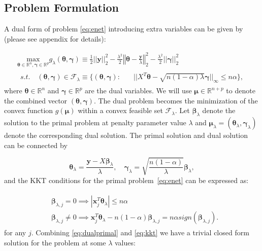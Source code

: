 \subsection{Problem Formulation}

A dual form of problem \eqref{eq:enet} introducing extra variables can be given by (please see appendix for details):

\begin{gather}
        \label{eq:dualtheta}
        \underset{\boldsymbol\theta\in \mathbb{R}^{ n},\boldsymbol\gamma\in\mathbb{R}^p}{\mathrm{max}}g_\lambda(\boldsymbol\theta,\boldsymbol\gamma)\equiv\frac{1}{2}||\boldsymbol y||_2^2-\frac{\lambda^2}{2}\left\Vert\boldsymbol\theta-\frac{\boldsymbol y}{\lambda}\right\Vert_2^2-\frac{\lambda^2}{2}||\boldsymbol\gamma||_2^2\\
        \begin{aligned}s.t.\quad (\boldsymbol\theta,\boldsymbol\gamma)\in \mathcal{F}_\lambda\equiv\{(\boldsymbol\theta,\boldsymbol\gamma):\quad
            &||X^T\boldsymbol\theta-\sqrt{n(1-\alpha)\lambda}\boldsymbol\gamma||_\infty\leq n\alpha\}\nonumber,
        \end{aligned}
\end{gather}
where $\boldsymbol\theta\in \mathbb{R}^{n}$ and $\boldsymbol\gamma\in\mathbb{R}^p$ are the dual variables. We will use $\boldsymbol\mu\in \mathbb{R}^{n+p}$ to denote the combined vector $(\boldsymbol \theta,\boldsymbol\gamma)$. The dual problem becomes the minimization of the convex function $g(\boldsymbol\mu)$ within a convex feasible set $\mathcal{F}_\lambda$. Let $\boldsymbol\beta_\lambda$ denote the solution to the primal problem at penalty parameter value $\lambda$ and $\boldsymbol\mu_{\lambda}=(\boldsymbol\theta_{\lambda},\boldsymbol\gamma_\lambda)$ denote the corresponding dual solution. The primal solution and dual solution can be connected by

\begin{equation}
    \label{eq:dualprimal}
    \boldsymbol\theta_\lambda=\frac{\boldsymbol y-X\boldsymbol\beta_\lambda}{\lambda},\quad \boldsymbol\gamma_\lambda=\sqrt{\frac{n(1-\alpha)}{\lambda}}\boldsymbol\beta_\lambda,
\end{equation}
and the KKT conditions for the primal problem~\eqref{eq:enet} can be expressed as:

\begin{gather}
    \label{eq:kkt}
    \begin{aligned}&\boldsymbol\beta_{\lambda,j}=0\implies|\boldsymbol x_j^T\boldsymbol\theta_\lambda|\leq n\alpha\\
    & \boldsymbol\beta_{\lambda,j}\neq0\implies  \boldsymbol x_j^T\boldsymbol\theta_\lambda-n(1-\alpha)\boldsymbol\beta_{\lambda,j}=n\alpha\textit{sign}(\boldsymbol\beta_{\lambda,j}).
    \end{aligned}
\end{gather}
for any $j$. Combining \eqref{eq:dualprimal} and \eqref{eq:kkt} we have a trivial closed form solution for the problem at some $\lambda$ values:

